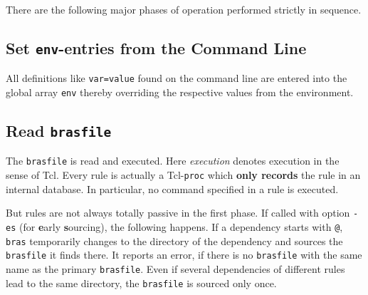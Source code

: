 \documentclass[12pt]{article}
\newcommand{\bras}{\texttt{bras}}
\begin{document}
There are the following major phases of operation performed strictly in
sequence.

\subsection{Set \texttt{env}-entries from the Command Line}
\label{secEnv}
All definitions like \texttt{var=value} found on the command
line are entered into the global array \texttt{env} thereby
overriding the respective values from the environment.



\subsection{Read \texttt{brasfile}}

The \texttt{brasfile} is read and executed. Here \textit{execution}
denotes execution in the sense of Tcl. Every rule is actually a
Tcl-\texttt{proc} which \textbf{only records} the rule in an internal
database. In particular, no command specified in a rule is executed.

But rules are not always totally passive in the first phase.  If
called with option \texttt{-es} (for \textbf{e}arly
\textbf{s}ourcing), the following happens.  If a dependency starts
with \texttt{@}, \bras{} temporarily changes to the directory of the
dependency and sources the \texttt{brasfile} it finds there. It
reports an error, if there is no \texttt{brasfile} with the same name
as the primary \texttt{brasfile}. Even if several dependencies of
different rules lead to the same directory, the \texttt{brasfile} is
sourced only once.
\end{document}
